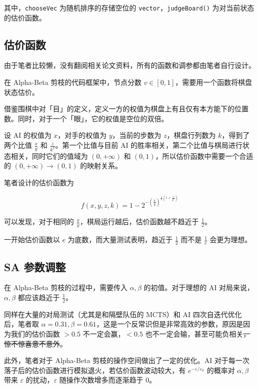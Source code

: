 \documentclass{noithesis}
\begin{document}
	其中，\verb|chooseVec| 为随机排序的存储空位的 \verb|vector|，\verb|judgeBoard()| 为对当前状态的估价函数。

	\subsection{估价函数}
	
	由于笔者比较懒，没有翻阅相关论文资料，所有的函数和调参都由笔者自行设计。
	
	在 Alpha-Beta 剪枝的代码框架中，节点分数 $v \in [0, 1]$，需要用一个函数将棋盘状态估价。
	
	借鉴围棋中对「目」的定义，定义一方的权值为棋盘上有且仅有本方能下的位置数。同时，对于一个「眼」，它的权值是空位的双倍。
	
	设 AI 的权值为 $x$，对手的权值为 $y$，当前的步数为 $z$，棋盘行列数为 $k$，得到了两个比值 $\frac xy$ 和 $\frac z{k^2}$。第一个比值与目前 AI 的胜率相关，第二个比值与棋局进行状态相关，同时它们的值域为 $(0,+\infty)$ 和 $(0,1)$，所以估价函数中需要一个合适的 $(0, +\infty) \to (0, 1)$ 的映射关系。
	
	笔者设计的估价函数为
	
	\begin{displaymath}
		f(x, y, z, k) = 1 - 2 ^ {-(\frac xy) ^ {\frac 14 \left(1+\frac{z}{k^2}\right)}} 
	\end{displaymath}

	可以发现，对于相同的 $\frac xy$，棋局运行越后，估价函数越不趋近于 $\frac 12$。
	
	一开始估价函数以 $e$ 为底数，而大量测试表明，趋近于 $\frac 12$ 而不是 $\frac 1e$ 会更为理想。
		
	\subsection{SA 参数调整}
	
	在 Alpha-Beta 剪枝的过程中，需要传入 $\alpha, \beta$ 的初值。对于理想的 AI 对局来说，$\alpha, \beta$ 都应该趋近于 $\frac 12$。
	
	同样在大量的对局测试（尤其是和隔壁队伍的 MCTS）和 AI 四次自迭代优化后，笔者取 $\alpha = 0.31,\beta = 0.61$，这是一个反常识但是非常高效的参数，原因是因为我们的估价函数 $>0.5$ 不一定会赢，$<0.5$ 也不一定会输，甚至可能负相关\sout{，惊不惊喜意不意外}。
	
	此外，笔者对于 Alpha-Beta 剪枝的操作空间做出了一定的优化。AI 对于每一次落子后的估价函数进行模拟退火，若估价函数波动较大，有 $e^{-\varepsilon/\varepsilon_0}$ 的概率对 $\alpha, \beta$ 带来 $\varepsilon$ 的扰动，$\varepsilon$ 随操作次数增多而逐渐趋于 $0$。
	
\end{document}
